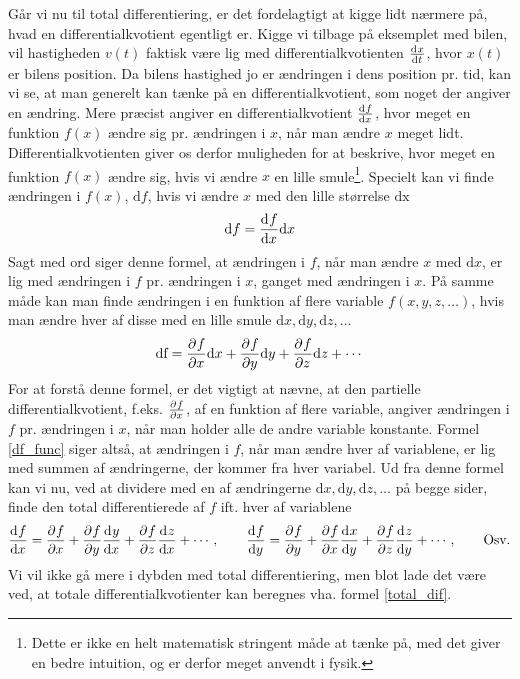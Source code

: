 \noindent
Går vi nu til total differentiering, er det fordelagtigt at kigge lidt nærmere på, hvad en differentialkvotient egentligt er. Kigge vi tilbage på eksemplet med bilen, vil hastigheden $v(t)$ faktisk være lig med differentialkvotienten $\dif{t}{x}$, hvor $x(t)$ er bilens position. Da bilens hastighed jo er ændringen i dens position pr. tid, kan vi se, at man generelt kan tænke på en differentialkvotient, som noget der angiver en ændring. Mere præcist angiver en differentialkvotient $\dif
{x}{f}$, hvor meget en funktion $f(x)$ ændre sig pr. ændringen i $x$, når man ændre $x$ meget lidt. Differentialkvotienten giver os derfor muligheden for at beskrive, hvor meget en funktion $f(x)$ ændre sig, hvis vi ændre $x$ en lille smule\footnote{Dette er ikke en helt matematisk stringent måde at tænke på, med det giver en bedre intuition, og er derfor meget anvendt i fysik.}. Specielt kan vi finde ændringen i $f(x)$, $\text{d}f$, hvis vi ændre $x$ med den lille størrelse $\text{dx}$
\begin{equation*}
\text{d}f = \dif{x}{f} \text{d}x
\end{equation*}
Sagt med ord siger denne formel, at ændringen i $f$, når man ændre $x$ med $\text{d}x$, er lig med ændringen i $f$ pr. ændringen i $x$, ganget med ændringen i $x$. På samme måde kan man finde ændringen i en funktion af flere variable $f(x,y,z,\ldots)$, hvis man ændre hver af disse med en lille smule $\text{d}x,\text{d}y,\text{d}z,\ldots$
\begin{equation}
\label{df_func}
\text{df} = \pdif{x}{f} \text{d}x + \pdif{y}{f} \text{d}y + \pdif{z}{f} \text{d}z + \cdots
\end{equation}
For at forstå denne formel, er det vigtigt at nævne, at den partielle differentialkvotient, f.eks. $\pdif{x}{f}$, af en funktion af flere variable, angiver ændringen i $f$ pr. ændringen i $x$, når man holder alle de andre variable konstante. Formel \eqref{df_func} siger altså, at ændringen i $f$, når man ændre hver af variablene, er lig med summen af ændringerne, der kommer fra hver variabel. Ud fra denne formel kan vi nu, ved at dividere med en af ændringerne $\text{d}x,\text{d}y,\text{d}z,\ldots$ på begge sider, finde den total differentierede af $f$ ift. hver af variablene
\begin{align}
\label{total_dif}
\dif{x}{f} = \pdif{x}{f} + \pdif{y}{f} \dif{x}{y} + \pdif{z}{f} \dif{x}{z} + \cdots \, , \qquad \dif{y}{f} = \pdif{y}{f} + \pdif{x}{f} \dif{y}{x} + \pdif{z}{f} \dif{y}{z} + \cdots \, , \qquad \text{Osv.}
\end{align}
Vi vil ikke gå mere i dybden med total differentiering, men blot lade det være ved, at totale differentialkvotienter kan beregnes vha. formel \eqref{total_dif}. 


